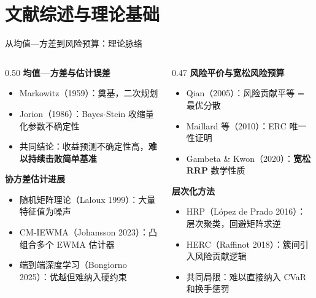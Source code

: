 \documentclass[aspectratio=169,11pt]{beamer}
\begin{document}
\section{文献综述与理论基础}

\begin{frame}[shrink=3]{从均值—方差到风险预算：理论脉络}
  \begin{columns}[T]
    \begin{column}{0.50\textwidth}
      \textbf{均值—方差与估计误差}
      \begin{itemize}
        \item Markowitz（1959）：奠基，二次规划
        \item Jorion（1986）：Bayes-Stein 收缩量化参数不确定性
        \item \alert{共同结论}：收益预测不确定性高，\textbf{难以持续击败简单基准}
      \end{itemize}
      \vspace{0.35em}
      \textbf{协方差估计进展}
      \begin{itemize}
        \item 随机矩阵理论（Laloux 1999）：大量特征值为噪声
        \item CM-IEWMA（Johansson 2023）：凸组合多个 EWMA 估计器
        \item 端到端深度学习（Bongiorno 2025）：优越但\alert{难纳入硬约束}
      \end{itemize}
    \end{column}
    \begin{column}{0.47\textwidth}
      \textbf{风险平价与宽松风险预算}
      \begin{itemize}
        \item Qian（2005）：风险贡献平等 = 最优分散
        \item Maillard 等（2010）：ERC 唯一性证明
        \item Gambeta \& Kwon（2020）：\textbf{宽松 RRP} 数学性质
      \end{itemize}
      \vspace{0.35em}
      \textbf{层次化方法}
      \begin{itemize}
        \item HRP（López de Prado 2016）：层次聚类，回避矩阵求逆
        \item HERC（Raffinot 2018）：簇间引入风险贡献逻辑
        \item \alert{共同局限}：难以直接纳入 CVaR 和换手惩罚
      \end{itemize}
    \end{column}
  \end{columns}
\end{frame}
\end{document}
